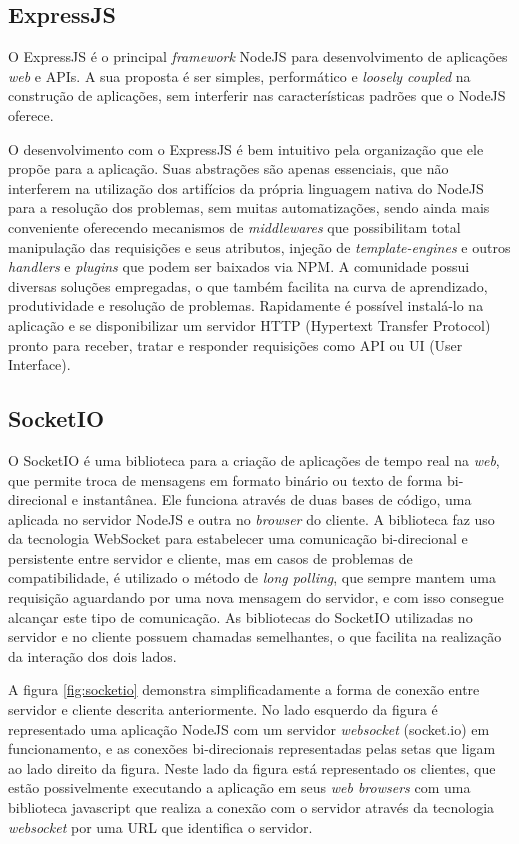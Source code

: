 \subsection{ExpressJS}
O ExpressJS \cite{expressjs} é o principal \textit{framework} NodeJS para desenvolvimento de aplicações \textit{web} e APIs. A sua proposta é ser simples, performático e \textit{loosely coupled} na construção de aplicações, sem interferir nas características padrões que o NodeJS oferece.

O desenvolvimento com o ExpressJS é bem intuitivo pela organização que ele propõe para a aplicação. Suas abstrações são apenas essenciais, que não interferem na utilização dos artifícios da própria linguagem nativa do NodeJS para a resolução dos problemas, sem muitas automatizações, sendo ainda mais conveniente oferecendo mecanismos de \textit{middlewares} que possibilitam total manipulação das requisições e seus atributos, injeção de \textit{template-engines} e outros \textit{handlers} e \textit{plugins} que podem ser baixados via NPM. A comunidade possui diversas soluções empregadas, o que também facilita na curva de aprendizado, produtividade e resolução de problemas. Rapidamente é possível instalá-lo na aplicação e se disponibilizar um servidor HTTP (Hypertext Transfer Protocol) pronto para receber, tratar e responder requisições como API ou UI (User Interface).

\subsection{SocketIO}
O SocketIO é uma biblioteca para a criação de aplicações de tempo real na \textit{web}, que permite troca de mensagens em formato binário ou texto de forma bi-direcional e instantânea. Ele funciona através de duas bases de código, uma aplicada no servidor NodeJS e outra no \textit{browser} do cliente. A biblioteca faz uso da tecnologia WebSocket para estabelecer uma comunicação bi-direcional e persistente entre servidor e cliente, mas em casos de problemas de compatibilidade, é utilizado o método de \textit{long polling}, que sempre mantem uma requisição aguardando por uma nova mensagem do servidor, e com isso consegue alcançar este tipo de comunicação. As bibliotecas do SocketIO utilizadas no servidor e no cliente possuem chamadas semelhantes, o que facilita na realização da interação dos dois lados.

A figura \ref{fig:socketio} demonstra simplificadamente a forma de conexão entre servidor e cliente descrita anteriormente. No lado esquerdo da figura é representado uma aplicação NodeJS com um servidor \textit{websocket} (socket.io) em funcionamento, e as conexões bi-direcionais representadas pelas setas que ligam ao lado direito da figura. Neste lado da figura está representado os clientes, que estão possivelmente executando a aplicação em seus \textit{web browsers} com uma biblioteca javascript que realiza a conexão com o servidor através da tecnologia \textit{websocket} por uma URL que identifica o servidor.

